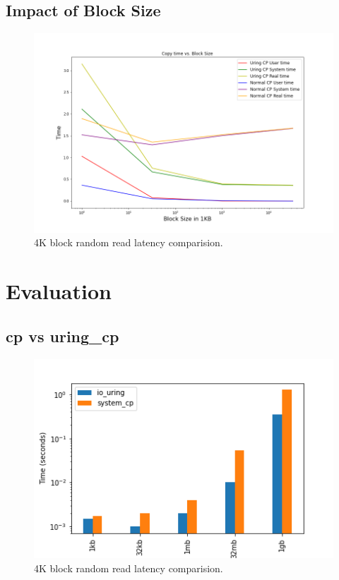 \documentclass{article}
\begin{document}
\subsection{Impact of Block Size}

\begin{figure}
    \centering
    \includegraphics[scale = 0.25]{cp_bs.png}
    \caption{4K block random read latency comparision.}
    \label{Figure5}
\end{figure}

\section{Evaluation}
\subsection{cp vs uring\_cp}

\begin{figure}
    \centering
    \includegraphics[scale = 0.5]{cp_perf_compare.png}
    \caption{4K block random read latency comparision.}
    \label{Figure6}
\end{figure}
\end{document}
